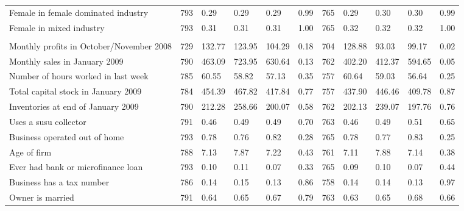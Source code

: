 \begin{table}[H]
{\begin{tabular}{lllllllllll}
\hspace{1em}Female in female dominated industry & 793 & 0.29 & 0.29 & 0.29 & 0.99 & 765 & 0.29 & 0.30 & 0.30 & 0.99\\
\hspace{1em}Female in mixed industry & 793 & 0.31 & 0.31 & 0.31 & 1.00 & 765 & 0.32 & 0.32 & 0.32 & 1.00\\
\addlinespace[0.3em]
\multicolumn{11}{l}{\textbf{Other variables}}\\
\hspace{1em}Monthly profits in October/November 2008 & 729 & 132.77 & 123.95 & 104.29 & 0.18 & 704 & 128.88 & 93.03 & 99.17 & 0.02\\
\hspace{1em}Monthly sales in January 2009 & 790 & 463.09 & 723.95 & 630.64 & 0.13 & 762 & 402.20 & 412.37 & 594.65 & 0.05\\
\hspace{1em}Number of hours worked in last week & 785 & 60.55 & 58.82 & 57.13 & 0.35 & 757 & 60.64 & 59.03 & 56.64 & 0.25\\
\hspace{1em}Total capital stock in January 2009 & 784 & 454.39 & 467.82 & 417.84 & 0.77 & 757 & 437.90 & 446.46 & 409.78 & 0.87\\
\hspace{1em}Inventories at end of January 2009 & 790 & 212.28 & 258.66 & 200.07 & 0.58 & 762 & 202.13 & 239.07 & 197.76 & 0.76\\
\hspace{1em}Uses a susu collector & 791 & 0.46 & 0.49 & 0.49 & 0.70 & 763 & 0.46 & 0.49 & 0.51 & 0.65\\
\hspace{1em}Business operated out of home & 793 & 0.78 & 0.76 & 0.82 & 0.28 & 765 & 0.78 & 0.77 & 0.83 & 0.25\\
\hspace{1em}Age of firm & 788 & 7.13 & 7.87 & 7.22 & 0.43 & 761 & 7.11 & 7.88 & 7.14 & 0.38\\
\hspace{1em}Ever had bank or microfinance loan & 793 & 0.10 & 0.11 & 0.07 & 0.33 & 765 & 0.09 & 0.10 & 0.07 & 0.44\\
\hspace{1em}Business has a tax number & 786 & 0.14 & 0.15 & 0.13 & 0.86 & 758 & 0.14 & 0.14 & 0.13 & 0.97\\
\hspace{1em}Owner is married & 791 & 0.64 & 0.65 & 0.67 & 0.79 & 763 & 0.63 & 0.65 & 0.68 & 0.66\\

\end{tabular}}
\end{table}
